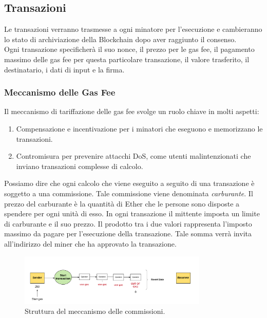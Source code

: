 \documentclass[a4paper,11pt]{report}
\begin{document}
\subsection{Transazioni}
Le transazioni verranno trasmesse a ogni minatore per l'esecuzione e cambieranno lo stato di archiviazione della Blockchain dopo aver raggiunto il consenso. \\
Ogni transazione specificherà il suo nonce, il prezzo per le gas fee, il pagamento massimo delle gas fee per questa particolare transazione, il valore trasferito, il destinatario, i dati di input e la firma.

\subsubsection{Meccanismo delle Gas Fee} 
Il meccanismo di tariffazione delle gas fee svolge un ruolo chiave in molti aspetti: 
\begin{enumerate}
\item  Compensazione e incentivazione per i minatori che eseguono e memorizzano le transazioni.
\item  Contromisura per prevenire attacchi DoS, come utenti malintenzionati che inviano transazioni complesse di calcolo.
\end{enumerate}
Possiamo dire che ogni calcolo che viene eseguito a seguito di una transazione è soggetto a una commissione. Tale commissione viene denominata \textit{carburante}.
Il prezzo del carburante è la quantità di Ether che le persone sono disposte a spendere per ogni unità di esso. In ogni transazione il mittente imposta un limite di carburante e il suo prezzo. Il prodotto tra i due valori rappresenta l'imposto massimo da pagare per l'esecuzione della transazione. Tale somma verrà invita all'indirizzo del miner che ha approvato la transazione.
\begin{figure}[htbp] 
\begin{center}
\includegraphics[width=9cm]{img/gas.png} 
\end{center}
\caption{Struttura del meccanismo delle commissioni.}
\end{figure} 
\end{document}
